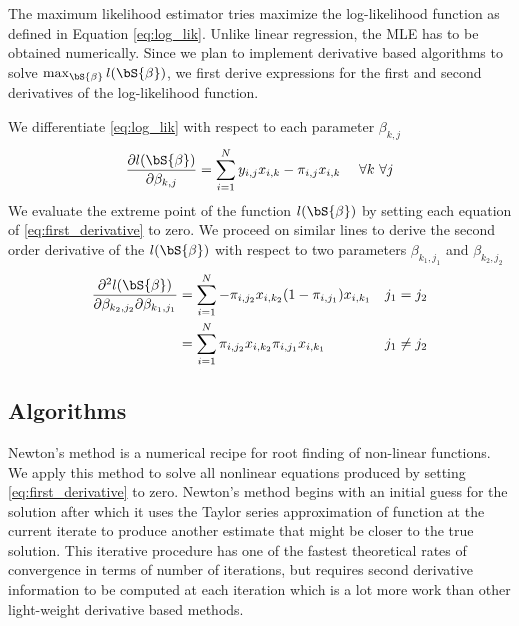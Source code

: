 The maximum likelihood estimator tries maximize the log-likelihood function as defined in Equation \eqref{eq:log_lik}. Unlike linear regression, the MLE has to be obtained numerically. Since we plan to implement derivative based algorithms to solve $\max_{\bS{\beta}} l(\bS{\beta})$, we first derive expressions for the first and second derivatives of the log-likelihood function. 

We differentiate \eqref{eq:log_lik} with respect to each parameter $\beta_{k,j}$
\begin{equation}\label{eq:first_derivative}
\frac{\partial l(\bS{\beta})}{\partial \beta_{k,j}} = \sum_{i=1}^{N} y_{i,j}x_{i,k} - \pi_{i,j}x_{i,k} \ \ \ \ \forall k \  \forall j
\end{equation}
We  evaluate the extreme point of the function $l(\bS{\beta})$ by setting each equation of \eqref{eq:first_derivative} to zero. We proceed on similar lines to derive the second order derivative of the $l(\bS{\beta})$ with respect to two parameters $\beta_{k_1,j_1}$ and $\beta_{k_2,j_2}$
\begin{subequations}
\begin{align}\label{eq:second_derivative}
\frac{\partial^2 l(\bS{\beta})}{\partial \beta_{k_2,j_2} \partial \beta_{k_1,j_1}} 
&= \sum_{i=1}^{N} -\pi_{i,j_2}x_{i,k_2}(1-\pi_{i,j_1})x_{i,k_1} &&j_1 = j_2 \\
&= \sum_{i=1}^{N} \pi_{i,j_2}x_{i,k_2}\pi_{i,j_1}x_{i,k_1} &&j_1 \neq j_2 
\end{align}
\end{subequations}

\subsection{Algorithms}
Newton's method is a numerical recipe for root finding of non-linear functions. We apply this method to solve all nonlinear equations produced by setting  \eqref{eq:first_derivative} to zero. Newton's method begins with an initial guess  for the solution after which it uses the Taylor series approximation of function at the current iterate to produce another estimate that might be closer to the true solution. This iterative procedure has one of the fastest theoretical rates of convergence in terms of number of iterations, but requires second derivative information to be computed at each iteration which is a lot more work than other light-weight derivative based methods.

